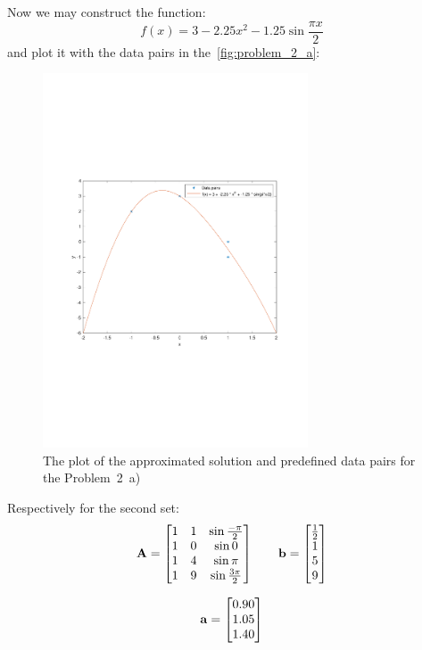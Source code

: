 Now we may construct the function:
\begin{equation*}
  f(x)=3-2.25x^2-1.25\sin{\frac{\pi{}x}{2}}
\end{equation*}
and plot it with the data pairs in the~\autoref{fig:problem_2_a}:

\begin{figure}
  \centering
  \includegraphics[width=0.7\textwidth]{images/Problem_2_a_plot.pdf}
  \caption{The plot of the approximated solution and predefined data pairs
    for the Problem~2~a)}\label{fig:problem_2_a}
\end{figure}

Respectively for the second set:
\begin{equation*}
  \mathbf{A} = \begin{bmatrix}
    1 & 1 & \sin{\frac{-\pi}{2}} \\
    1 & 0 & \sin{0} \\
    1 & 4 & \sin{\pi} \\
    1 & 9 & \sin{\frac{3\pi}{2}}
  \end{bmatrix} \qquad
  \mathbf{b} = \begin{bmatrix}
    \frac{1}{2} \\
    1 \\
    5 \\
    9
  \end{bmatrix}
\end{equation*}

\begin{equation*}
  \mathbf{a} = \begin{bmatrix}
    0.90 \\
    1.05 \\
    1.40
  \end{bmatrix}
\end{equation*}

